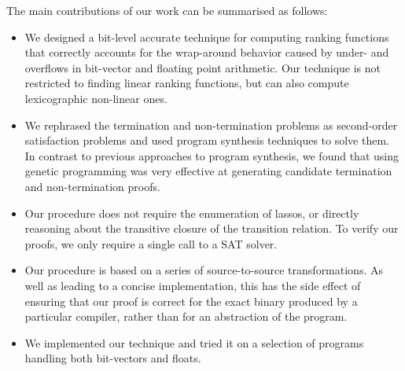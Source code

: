 \documentclass[preprint]{sigplanconf}
\theoremstyle{definition}
\begin{document}


 The main contributions of our work can be summarised as follows:


\begin{itemize}
\item We designed a bit-level accurate technique for computing ranking functions that correctly accounts for the wrap-around behavior
caused by under- and overflows in bit-vector and floating point arithmetic. Our technique is not restricted to finding linear ranking functions,
but can also compute lexicographic non-linear  ones.

\item  We rephrased the termination and non-termination problems as second-order satisfaction problems and used
program synthesis techniques to solve them. In contrast to previous approaches to program synthesis, we found that
using genetic programming was very effective at generating candidate termination and non-termination proofs.

\item Our procedure does not require the enumeration of lassos, or directly reasoning about the transitive closure of the transition relation.
To verify our proofs, we only require a single call to a SAT solver.



\item Our procedure is based on a series of source-to-source transformations.  As well as leading to a concise implementation,
this has the side effect of ensuring that our proof is correct for the exact binary produced by a particular compiler,
rather than for an abstraction of the program.

\item We implemented our technique and tried it on a selection of programs handling both bit-vectors and floats.

\end{itemize}
\end{document}
